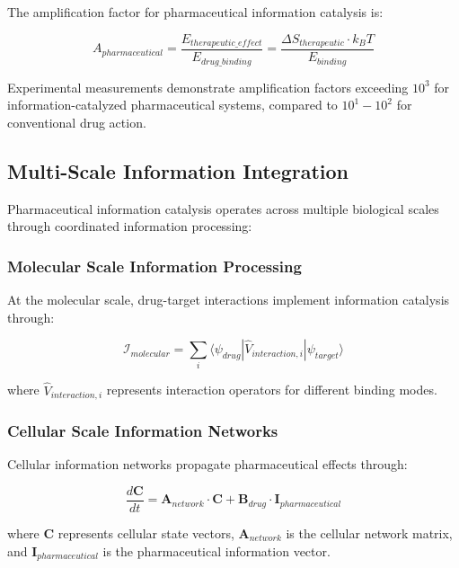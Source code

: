 \documentclass[12pt,a4paper]{article}
\begin{document}
The amplification factor for pharmaceutical information catalysis is:

\begin{equation}
A_{pharmaceutical} = \frac{E_{therapeutic\_effect}}{E_{drug\_binding}} = \frac{\Delta S_{therapeutic} \cdot k_B T}{E_{binding}}
\end{equation}

Experimental measurements demonstrate amplification factors exceeding $10^3$ for information-catalyzed pharmaceutical systems, compared to $10^1-10^2$ for conventional drug action.

\subsection{Multi-Scale Information Integration}

Pharmaceutical information catalysis operates across multiple biological scales through coordinated information processing:

\subsubsection{Molecular Scale Information Processing}

At the molecular scale, drug-target interactions implement information catalysis through:

\begin{equation}
\mathcal{I}_{molecular} = \sum_{i} \langle \psi_{drug} | \hat{V}_{interaction,i} | \psi_{target} \rangle
\end{equation}

where $\hat{V}_{interaction,i}$ represents interaction operators for different binding modes.

\subsubsection{Cellular Scale Information Networks}

Cellular information networks propagate pharmaceutical effects through:

\begin{equation}
\frac{d\mathbf{C}}{dt} = \mathbf{A}_{network} \cdot \mathbf{C} + \mathbf{B}_{drug} \cdot \mathbf{I}_{pharmaceutical}
\end{equation}

where $\mathbf{C}$ represents cellular state vectors, $\mathbf{A}_{network}$ is the cellular network matrix, and $\mathbf{I}_{pharmaceutical}$ is the pharmaceutical information vector.
\end{document}
